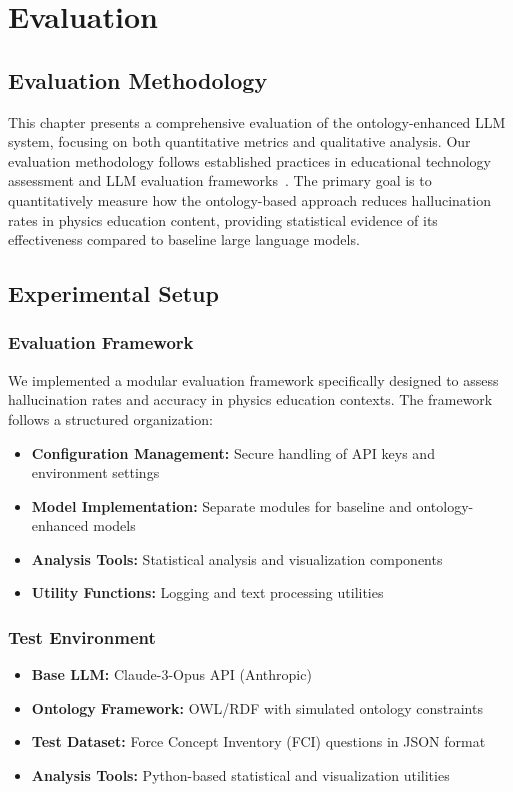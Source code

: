 \chapter{Evaluation}
\label{chap:evaluation}

\section{Evaluation Methodology}
\label{sec:eval-methodology}

This chapter presents a comprehensive evaluation of the ontology-enhanced LLM system, focusing on both quantitative metrics and qualitative analysis. Our evaluation methodology follows established practices in educational technology assessment and LLM evaluation frameworks~\cite{chen2024comparing}. The primary goal is to quantitatively measure how the ontology-based approach reduces hallucination rates in physics education content, providing statistical evidence of its effectiveness compared to baseline large language models.

\section{Experimental Setup}
\label{sec:experimental-setup}

\subsection{Evaluation Framework}
We implemented a modular evaluation framework specifically designed to assess hallucination rates and accuracy in physics education contexts. The framework follows a structured organization:

\begin{itemize}
    \item \textbf{Configuration Management:} Secure handling of API keys and environment settings
    \item \textbf{Model Implementation:} Separate modules for baseline and ontology-enhanced models
    \item \textbf{Analysis Tools:} Statistical analysis and visualization components
    \item \textbf{Utility Functions:} Logging and text processing utilities
\end{itemize}

\subsection{Test Environment}
\begin{itemize}
    \item \textbf{Base LLM:} Claude-3-Opus API (Anthropic)
    \item \textbf{Ontology Framework:} OWL/RDF with simulated ontology constraints
    \item \textbf{Test Dataset:} Force Concept Inventory (FCI) questions in JSON format
    \item \textbf{Analysis Tools:} Python-based statistical and visualization utilities
\end{itemize}

